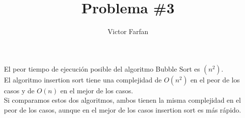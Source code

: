 \documentclass{article}
\begin{document}
\title{Problema \#3}
\author{Victor Farfan}
\maketitle
	\begin{algorithm}[H]
	\newline
	\end{algorithm}\textsl{}

\newenvironment{answer}
\begin{answer}
El peor tiempo de ejecución posible del algoritmo Bubble Sort es \begin{math}(n^2) \end{math}.\\ 

El algoritmo insertion sort tiene una complejidad de \begin{math}O(n^2)
\end{math} en el peor de los casos y de \begin{math} O(n)
\end{math} en el mejor de los casos.\\

Si comparamos estos dos algoritmos, ambos tienen la misma complejidad en el peor de los casos, aunque en el mejor de los casos insertion sort es más rápido.
\end{document}
